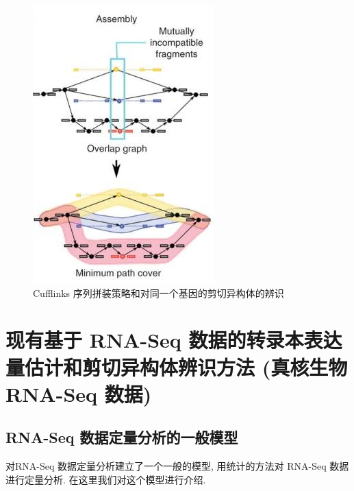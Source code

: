 \begin{figure}[!t]
\centering
\includegraphics[height=0.5\textheight]{figures/cufflinks-assembly.jpg}
\caption{Cufflinks 序列拼装策略和对同一个基因的剪切异构体的辨识 \cite{cufflinks.2010}}
\label{intro-cufflinks-assembly}
\end{figure}

\section{现有基于 RNA-Seq 数据的转录本表达量估计和剪切异构体辨识方法 (真核生物 RNA-Seq 数据)}
\label{intro-rna-seq-tools-summary}

\subsection{RNA-Seq 数据定量分析的一般模型}
\label{rna-seq-general-model}

 对RNA-Seq 数据定量分析建立了一个一般的模型, 
用统计的方法对 RNA-Seq 数据进行定量分析. 在这里我们对这个模型进行介绍. 


